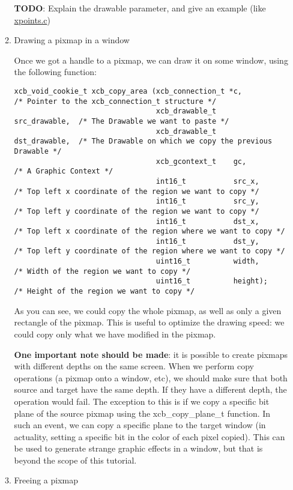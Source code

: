 \documentclass[12pt,oneside,titlepage]{book}
\begin{document}
\begin{enumerate}
\begin{enumerate}
    \textbf{TODO}: Explain the drawable parameter, and give an example
    (like \url{xpoints.c})
  \item
    \protect\hypertarget{pixmapsdraw}{}{}Drawing a pixmap in a window

    Once we got a handle to a pixmap, we can draw it on some window,
    using the following function:

\begin{verbatim}
xcb_void_cookie_t xcb_copy_area (xcb_connection_t *c,             /* Pointer to the xcb_connection_t structure */
                                 xcb_drawable_t    src_drawable,  /* The Drawable we want to paste */
                                 xcb_drawable_t    dst_drawable,  /* The Drawable on which we copy the previous Drawable */
                                 xcb_gcontext_t    gc,            /* A Graphic Context */
                                 int16_t           src_x,         /* Top left x coordinate of the region we want to copy */
                                 int16_t           src_y,         /* Top left y coordinate of the region we want to copy */
                                 int16_t           dst_x,         /* Top left x coordinate of the region where we want to copy */
                                 int16_t           dst_y,         /* Top left y coordinate of the region where we want to copy */
                                 uint16_t          width,         /* Width of the region we want to copy */
                                 uint16_t          height);       /* Height of the region we want to copy */
\end{verbatim}

    As you can see, we could copy the whole pixmap, as well as only a
    given rectangle of the pixmap. This is useful to optimize the
    drawing speed: we could copy only what we have modified in the
    pixmap.

    \textbf{One important note should be made}: it is possible to create
    pixmaps with different depths on the same screen. When we perform
    copy operations (a pixmap onto a window, etc), we should make sure
    that both source and target have the same depth. If they have a
    different depth, the operation would fail. The exception to this is
    if we copy a specific bit plane of the source pixmap using the
    {xcb\_copy\_plane\_t} function. In such an event, we can copy a
    specific plane to the target window (in actuality, setting a
    specific bit in the color of each pixel copied). This can be used to
    generate strange graphic effects in a window, but that is beyond the
    scope of this tutorial.
  \item
    \protect\hypertarget{pixmapsfree}{}{}Freeing a pixmap


\end{enumerate}
\end{enumerate}
\end{document}
